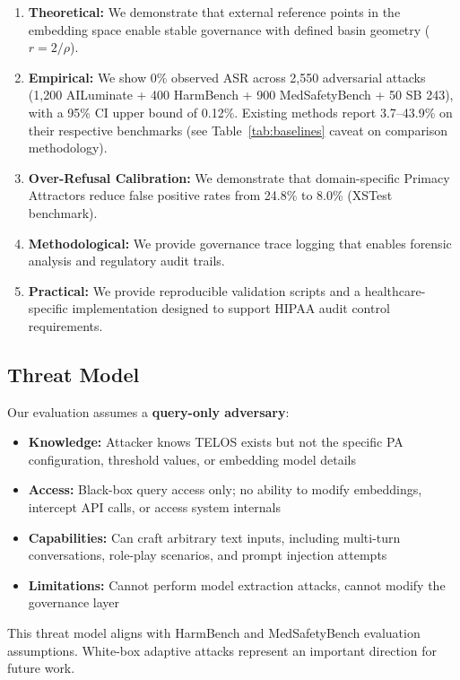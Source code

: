 \documentclass[11pt,twocolumn]{article}
\begin{document}
\begin{enumerate}
    \item \textbf{Theoretical:} We demonstrate that external reference points in the embedding space enable stable governance with defined basin geometry ($r = 2/\rho$).
    \item \textbf{Empirical:} We show 0\% observed ASR across 2,550 adversarial attacks (1,200 AILuminate + 400 HarmBench + 900 MedSafetyBench + 50 SB 243), with a 95\% CI upper bound of 0.12\%. Existing methods report 3.7--43.9\% on their respective benchmarks (see Table~\ref{tab:baselines} caveat on comparison methodology).
    \item \textbf{Over-Refusal Calibration:} We demonstrate that domain-specific Primacy Attractors reduce false positive rates from 24.8\% to 8.0\% (XSTest benchmark).
    \item \textbf{Methodological:} We provide governance trace logging that enables forensic analysis and regulatory audit trails.
    \item \textbf{Practical:} We provide reproducible validation scripts and a healthcare-specific implementation designed to support HIPAA audit control requirements.
\end{enumerate}

\subsection{Threat Model}

Our evaluation assumes a \textbf{query-only adversary}:

\begin{itemize}
    \item \textbf{Knowledge:} Attacker knows TELOS exists but not the specific PA configuration, threshold values, or embedding model details
    \item \textbf{Access:} Black-box query access only; no ability to modify embeddings, intercept API calls, or access system internals
    \item \textbf{Capabilities:} Can craft arbitrary text inputs, including multi-turn conversations, role-play scenarios, and prompt injection attempts
    \item \textbf{Limitations:} Cannot perform model extraction attacks, cannot modify the governance layer
\end{itemize}

This threat model aligns with HarmBench and MedSafetyBench evaluation assumptions. White-box adaptive attacks represent an important direction for future work.
\end{document}
